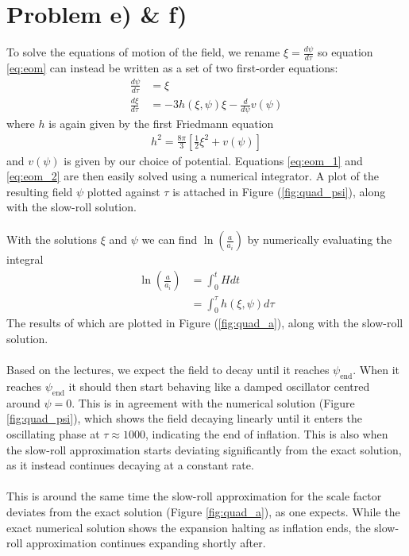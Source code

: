 \documentclass[reprint,english,notitlepage]{revtex4-1}  %
\numberwithin{equation}{section}
\begin{document}
\section{Problem e) \& f)}
To solve the equations of motion of the field, we rename
$\xi = \frac{d\psi}{d\tau}$ so equation \ref{eq:eom} can instead be written as
a set of two first-order equations:
\begin{align}
	\frac{d\psi}{d\tau} &= \xi \label{eq:eom_1} \\
	\frac{d\xi}{d\tau}  &= -3h(\xi, \psi) \xi - \frac{d}{d\psi}v(\psi) \label{eq:eom_2}
\end{align}
where $h$ is again given by the first Friedmann equation
\begin{align}
	h^2 = \frac{8\pi}{3}\left[ \frac{1}{2}\xi^2 + v(\psi)\right]
\end{align}
and $v(\psi)$ is given by our choice of potential. Equations \ref{eq:eom_1} and
\ref{eq:eom_2} are then easily solved using a numerical integrator. A plot of
the resulting field $\psi$ plotted against $\tau$ is attached in Figure
(\ref{fig:quad_psi}), along with the slow-roll solution.
\\ \\
With the
solutions $\xi$ and $\psi$ we can find $\ln\left(\frac{a}{a_i}\right)$
by numerically evaluating the integral
\begin{align}
	\ln\left(\frac{a}{a_i}\right) &= \int_0^t H dt \\
																&= \int_0^\tau h(\xi, \psi) d\tau
\end{align}
The results of which are plotted in Figure (\ref{fig:quad_a}), along with the slow-roll
solution.
\\ \\
Based on the lectures, we expect the field to decay until it reaches $\psi_{\mathrm{end}}$.
When it reaches $\psi_{\mathrm{end}}$ it should then start behaving like a damped oscillator
centred around $\psi=0$. This is in agreement with the numerical solution
(Figure \ref{fig:quad_psi}), which shows the field decaying linearly until it
enters the oscillating phase at $\tau\approx 1000$, indicating the end of inflation.
This is also when the slow-roll approximation starts deviating significantly
from the exact solution, as it instead continues decaying at a constant rate.
\\ \\
This is around the same time the slow-roll approximation for the scale factor
deviates from the exact solution (Figure \ref{fig:quad_a}), as one expects.
While the exact numerical solution shows the expansion halting as inflation ends,
the slow-roll approximation continues expanding shortly after.
\end{document}
